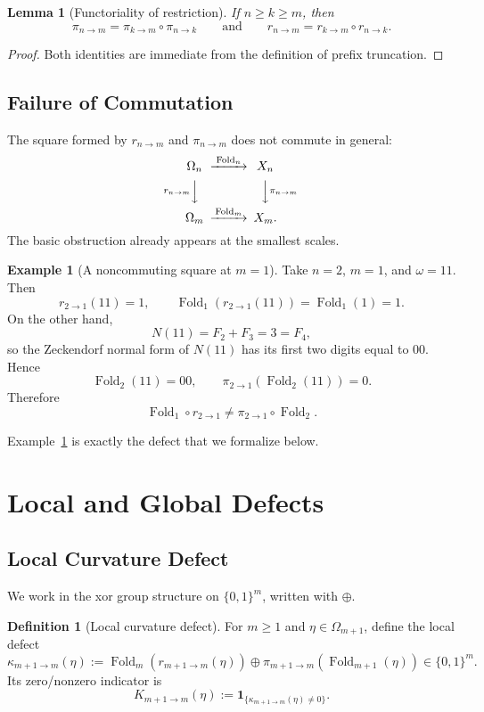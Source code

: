 \documentclass[11pt,letterpaper]{article}
\numberwithin{equation}{section}
\theoremstyle{plain}
\newtheorem{lemma}[theorem]{Lemma}
\theoremstyle{definition}
\newtheorem{definition}[theorem]{Definition}
\newtheorem{example}[theorem]{Example}
\theoremstyle{remark}
\DeclareMathOperator{\Fold}{Fold}
\begin{document}
\begin{lemma}[Functoriality of restriction]
\label{lem:pi-functorial-golden}
If $n\ge k\ge m$, then
\[
\pi_{n\to m}=\pi_{k\to m}\circ \pi_{n\to k}
\qquad\text{and}\qquad
r_{n\to m}=r_{k\to m}\circ r_{n\to k}.
\]
\end{lemma}

\begin{proof}
Both identities are immediate from the definition of prefix truncation.
\end{proof}

\subsection{Failure of Commutation}

The square formed by $r_{n\to m}$ and $\pi_{n\to m}$ does not commute in
general:
\[
\begin{CD}
\Omega_n @>{\Fold_n}>> X_n \\
@V{r_{n\to m}}VV @VV{\pi_{n\to m}}V \\
\Omega_m @>{\Fold_m}>> X_m.
\end{CD}
\]
The basic obstruction already appears at the smallest scales.

\begin{example}[A noncommuting square at $m=1$]
\label{ex:fold-noncommuting-square}
Take $n=2$, $m=1$, and $\omega=11$.  Then
\[
r_{2\to 1}(11)=1,
\qquad
\Fold_1(r_{2\to 1}(11))=\Fold_1(1)=1.
\]
On the other hand,
\[
N(11)=F_2+F_3=3=F_4,
\]
so the Zeckendorf normal form of $N(11)$ has its first two digits equal to
$00$.  Hence
\[
\Fold_2(11)=00,
\qquad
\pi_{2\to 1}(\Fold_2(11))=0.
\]
Therefore
\[
\Fold_1\circ r_{2\to 1}\neq \pi_{2\to 1}\circ \Fold_2.
\]
\end{example}

Example~\ref{ex:fold-noncommuting-square} is exactly the defect that we
formalize below.

\section{Local and Global Defects}

\subsection{Local Curvature Defect}

We work in the xor group structure on $\{0,1\}^m$, written with $\oplus$.

\begin{definition}[Local curvature defect]
\label{def:fold-local-curvature-defect}
For $m\ge 1$ and $\eta\in\Omega_{m+1}$, define the local defect
\[
\kappa_{m+1\to m}(\eta)
:=
\Fold_m(r_{m+1\to m}(\eta))
\oplus
\pi_{m+1\to m}(\Fold_{m+1}(\eta))
\in \{0,1\}^m.
\]
Its zero/nonzero indicator is
\[
K_{m+1\to m}(\eta):=\mathbf{1}_{\{\kappa_{m+1\to m}(\eta)\neq 0\}}.
\]
\end{definition}
\end{document}
